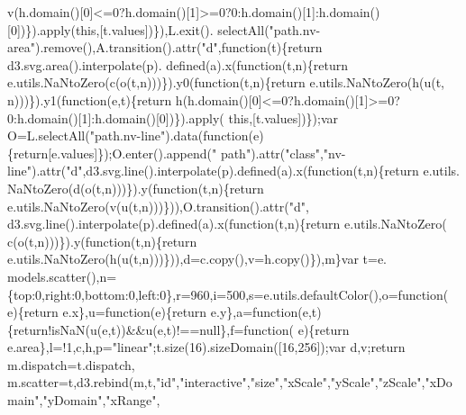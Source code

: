 \begin{DoxyCode}
{       v(h.domain()[0]<=0?h.domain()[1]>=0?0:h.domain()[1]:h.domain()[0])\}).apply(\textcolor{keyword}{this},[t.values])\}),L.exit().
      selectAll(\textcolor{stringliteral}{"path.nv-area"}).remove(),A.transition().attr(\textcolor{stringliteral}{"d"},\textcolor{keyword}{function}(t)\{\textcolor{keywordflow}{return} d3.svg.area().interpolate(p).
      defined(a).x(\textcolor{keyword}{function}(t,n)\{\textcolor{keywordflow}{return} e.utils.NaNtoZero(c(o(t,n)))\}).y0(\textcolor{keyword}{function}(t,n)\{\textcolor{keywordflow}{return} e.utils.NaNtoZero(h(u(t,
      n)))\}).y1(\textcolor{keyword}{function}(e,t)\{\textcolor{keywordflow}{return} h(h.domain()[0]<=0?h.domain()[1]>=0?0:h.domain()[1]:h.domain()[0])\}).apply(\textcolor{keyword}{
      this},[t.values])\});var O=L.selectAll(\textcolor{stringliteral}{"path.nv-line"}).data(\textcolor{keyword}{function}(e)\{\textcolor{keywordflow}{return}[e.values]\});O.enter().append(\textcolor{stringliteral}{"
      path"}).attr(\textcolor{stringliteral}{"class"},\textcolor{stringliteral}{"nv-line"}).attr(\textcolor{stringliteral}{"d"},d3.svg.line().interpolate(p).defined(a).x(\textcolor{keyword}{function}(t,n)\{\textcolor{keywordflow}{return} e.utils.
      NaNtoZero(d(o(t,n)))\}).y(\textcolor{keyword}{function}(t,n)\{\textcolor{keywordflow}{return} e.utils.NaNtoZero(v(u(t,n)))\})),O.transition().attr(\textcolor{stringliteral}{"d"},
      d3.svg.line().interpolate(p).defined(a).x(\textcolor{keyword}{function}(t,n)\{\textcolor{keywordflow}{return} e.utils.NaNtoZero(
      c(o(t,n)))\}).y(\textcolor{keyword}{function}(t,n)\{\textcolor{keywordflow}{return} e.utils.NaNtoZero(h(u(t,n)))\})),d=c.copy(),v=h.copy()\}),m\}var t=e.
      models.scatter(),n=\{top:0,right:0,bottom:0,left:0\},r=960,i=500,s=e.utils.defaultColor(),o=\textcolor{keyword}{function}(
      e)\{\textcolor{keywordflow}{return} e.x\},u=\textcolor{keyword}{function}(e)\{\textcolor{keywordflow}{return} e.y\},a=\textcolor{keyword}{function}(e,t)\{\textcolor{keywordflow}{return}!isNaN(u(e,t))&&u(e,t)!==null\},f=\textcolor{keyword}{function}(
      e)\{\textcolor{keywordflow}{return} e.area\},l=!1,c,h,p=\textcolor{stringliteral}{"linear"};t.size(16).sizeDomain([16,256]);var d,v;\textcolor{keywordflow}{return} m.dispatch=t.dispatch,
      m.scatter=t,d3.rebind(m,t,\textcolor{stringliteral}{"id"},\textcolor{stringliteral}{"interactive"},\textcolor{stringliteral}{"size"},\textcolor{stringliteral}{"xScale"},\textcolor{stringliteral}{"yScale"},\textcolor{stringliteral}{"zScale"},\textcolor{stringliteral}{"xDomain"},\textcolor{stringliteral}{"yDomain"},\textcolor{stringliteral}{"xRange"},\textcolor{stringliteral}{
}}
\end{DoxyCode}
